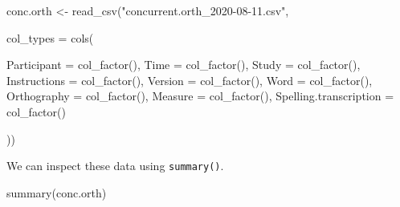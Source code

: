 \documentclass[
  letterpaper,
  DIV=11,
  numbers=noendperiod]{scrreprt}
\newenvironment{Shaded}{\begin{snugshade}}{\end{snugshade}}
\newcommand{\AttributeTok}[1]{\textcolor[rgb]{0.40,0.45,0.13}{#1}}
\newcommand{\FunctionTok}[1]{\textcolor[rgb]{0.28,0.35,0.67}{#1}}
\newcommand{\NormalTok}[1]{\textcolor[rgb]{0.00,0.23,0.31}{#1}}
\newcommand{\OtherTok}[1]{\textcolor[rgb]{0.00,0.23,0.31}{#1}}
\newcommand{\StringTok}[1]{\textcolor[rgb]{0.13,0.47,0.30}{#1}}
\begin{document}
\begin{Shaded}
\begin{Highlighting}[]
\NormalTok{conc.orth }\OtherTok{\textless{}{-}} \FunctionTok{read\_csv}\NormalTok{(}\StringTok{"concurrent.orth\_2020{-}08{-}11.csv"}\NormalTok{,}

                      \AttributeTok{col\_types =} \FunctionTok{cols}\NormalTok{(}

                        \AttributeTok{Participant =} \FunctionTok{col\_factor}\NormalTok{(),}
                        \AttributeTok{Time =} \FunctionTok{col\_factor}\NormalTok{(),}
                        \AttributeTok{Study =} \FunctionTok{col\_factor}\NormalTok{(),}
                        \AttributeTok{Instructions =} \FunctionTok{col\_factor}\NormalTok{(),}
                        \AttributeTok{Version =} \FunctionTok{col\_factor}\NormalTok{(),}
                        \AttributeTok{Word =} \FunctionTok{col\_factor}\NormalTok{(),}
                        \AttributeTok{Orthography =} \FunctionTok{col\_factor}\NormalTok{(),}
                        \AttributeTok{Measure =} \FunctionTok{col\_factor}\NormalTok{(),}
                        \AttributeTok{Spelling.transcription =} \FunctionTok{col\_factor}\NormalTok{()}

\NormalTok{                      ))}
\end{Highlighting}
\end{Shaded}

We can inspect these data using \texttt{summary()}.

\begin{Shaded}
\begin{Highlighting}[]
\FunctionTok{summary}\NormalTok{(conc.orth)}
\end{Highlighting}
\end{Shaded}
\end{document}
